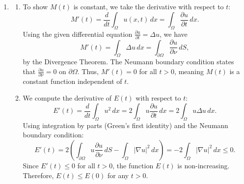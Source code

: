 \documentclass{article}
\begin{document}
\begin{enumerate}[label=\fbox{\arabic*}]
\begin{enumerate}[label=(\arabic*)]
          Next, we show that $T_r \to T_1$ in the operator norm as $r \to 1$. For any $f \in H^\infty(\mathbb{D})$ with $\|f\|_\infty \le 1$, we have
          \[
            |((T_1 - T_r)f)(z)| = \left| \int_r^1 f(tz) \, dt \right| \le \int_r^1 |f(tz)| \, dt \le \int_r^1 \|f\|_\infty \, dt = 1 - r.
          \]
          Taking the supremum over $z \in \mathbb{D}$ and over $f$ in the unit ball gives $\|T_1 - T_r\| \le 1 - r$. 
          As $r \to 1$, $\|T_1 - T_r\| \to 0$. Since the space of compact operators on a Banach space is closed in the operator norm topology, and $T_1$ is the uniform limit of the compact operators $T_r$, it follows that $T_1$ is a compact operator.
        \end{enumerate}

  \item %
        \begin{enumerate}[label=(\arabic*)]
          \item To show $M(t)$ is constant, we take the derivative with respect to $t$:
          \[
            M'(t) = \frac{d}{dt} \int_\Omega u(x, t) \, dx = \int_\Omega \frac{\partial u}{\partial t} \, dx.
          \]
          Using the given differential equation $\frac{\partial u}{\partial t} = \Delta u$, we have
          \[
            M'(t) = \int_\Omega \Delta u \, dx = \int_{\partial \Omega} \frac{\partial u}{\partial \nu} \, dS,
          \]
          by the Divergence Theorem. The Neumann boundary condition states that $\frac{\partial u}{\partial \nu} = 0$ on $\partial \Omega$. Thus, $M'(t) = 0$ for all $t > 0$, meaning $M(t)$ is a constant function independent of $t$.
          
          \item We compute the derivative of $E(t)$ with respect to $t$:
          \[
            E'(t) = \frac{d}{dt} \int_\Omega u^2 \, dx = 2 \int_\Omega u \frac{\partial u}{\partial t} \, dx = 2 \int_\Omega u \Delta u \, dx.
          \]
          Using integration by parts (Green's first identity) and the Neumann boundary condition:
          \[
            E'(t) = 2 \left( \int_{\partial \Omega} u \frac{\partial u}{\partial \nu} \, dS - \int_\Omega |\nabla u|^2 \, dx \right) = -2 \int_\Omega |\nabla u|^2 \, dx \le 0.
          \]
          Since $E'(t) \le 0$ for all $t > 0$, the function $E(t)$ is non-increasing. Therefore, $E(t) \le E(0)$ for any $t > 0$.
          

\end{enumerate}
\end{enumerate}
\end{document}
